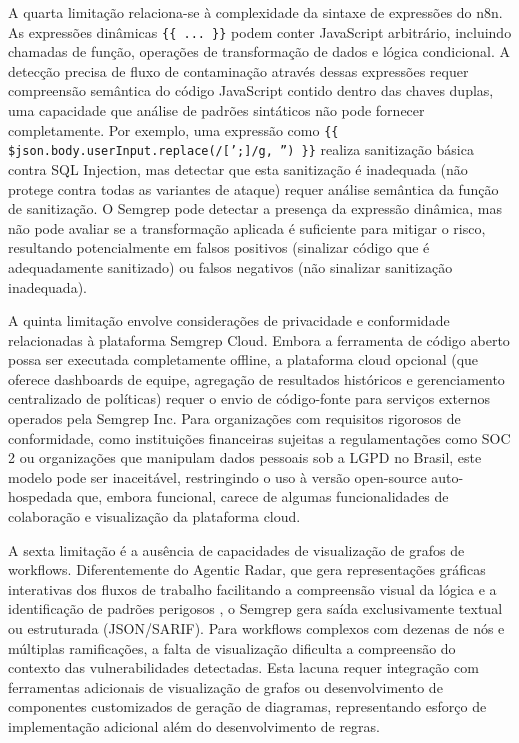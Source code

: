 \documentclass{sftex}
\begin{document}
A quarta limitação relaciona-se à complexidade da sintaxe de expressões do n8n. As expressões dinâmicas \texttt{\{\{ ... \}\}} podem conter JavaScript arbitrário, incluindo chamadas de função, operações de transformação de dados e lógica condicional. A detecção precisa de fluxo de contaminação através dessas expressões requer compreensão semântica do código JavaScript contido dentro das chaves duplas, uma capacidade que análise de padrões sintáticos não pode fornecer completamente. Por exemplo, uma expressão como \texttt{\{\{ \$json.body.userInput.replace(/[';]/g, '') \}\}} realiza sanitização básica contra SQL Injection, mas detectar que esta sanitização é inadequada (não protege contra todas as variantes de ataque) requer análise semântica da função de sanitização. O Semgrep pode detectar a presença da expressão dinâmica, mas não pode avaliar se a transformação aplicada é suficiente para mitigar o risco, resultando potencialmente em falsos positivos (sinalizar código que é adequadamente sanitizado) ou falsos negativos (não sinalizar sanitização inadequada).

A quinta limitação envolve considerações de privacidade e conformidade relacionadas à plataforma Semgrep Cloud. Embora a ferramenta de código aberto possa ser executada completamente offline, a plataforma cloud opcional (que oferece dashboards de equipe, agregação de resultados históricos e gerenciamento centralizado de políticas) requer o envio de código-fonte para serviços externos operados pela Semgrep Inc. Para organizações com requisitos rigorosos de conformidade, como instituições financeiras sujeitas a regulamentações como SOC 2 ou organizações que manipulam dados pessoais sob a LGPD no Brasil, este modelo pode ser inaceitável, restringindo o uso à versão open-source auto-hospedada que, embora funcional, carece de algumas funcionalidades de colaboração e visualização da plataforma cloud.

A sexta limitação é a ausência de capacidades de visualização de grafos de workflows. Diferentemente do Agentic Radar, que gera representações gráficas interativas dos fluxos de trabalho facilitando a compreensão visual da lógica e a identificação de padrões perigosos \cite{splxai_n8n_scanning}, o Semgrep gera saída exclusivamente textual ou estruturada (JSON/SARIF). Para workflows complexos com dezenas de nós e múltiplas ramificações, a falta de visualização dificulta a compreensão do contexto das vulnerabilidades detectadas. Esta lacuna requer integração com ferramentas adicionais de visualização de grafos ou desenvolvimento de componentes customizados de geração de diagramas, representando esforço de implementação adicional além do desenvolvimento de regras.
\end{document}

